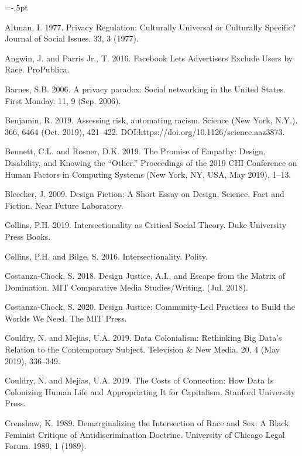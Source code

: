 \documentclass[11pt,dvipdfm]{article}
\begin{document}
\vspace{-.1cm}

\begin{thebibliography}{10}
\begin{small}
\itemsep=-.5pt

Altman, I. 1977. Privacy Regulation: Culturally Universal or Culturally Specific? Journal of Social Issues. 33, 3 (1977).

Angwin, J. and Parris Jr., T. 2016. Facebook Lets Advertisers Exclude Users by Race. ProPublica.

Barnes, S.B. 2006. A privacy paradox: Social networking in the United States. First Monday. 11, 9 (Sep. 2006).

Benjamin, R. 2019. Assessing risk, automating racism. Science (New York, N.Y.). 366, 6464 (Oct. 2019), 421–422. DOI:https://doi.org/10.1126/science.aaz3873.

Bennett, C.L. and Rosner, D.K. 2019. The Promise of Empathy: Design, Disability, and Knowing the “Other.” Proceedings of the 2019 CHI Conference on Human Factors in Computing Systems (New York, NY, USA, May 2019), 1–13.

Bleecker, J. 2009. Design Fiction: A Short Essay on Design, Science, Fact and Fiction. Near Future Laboratory.

Collins, P.H. 2019. Intersectionality as Critical Social Theory. Duke University Press Books.

Collins, P.H. and Bilge, S. 2016. Intersectionality. Polity.

Costanza-Chock, S. 2018. Design Justice, A.I., and Escape from the Matrix of Domination. MIT Comparative Media Studies/Writing. (Jul. 2018).

Costanza-Chock, S. 2020. Design Justice: Community-Led Practices to Build the Worlds We Need. The MIT Press.

Couldry, N. and Mejias, U.A. 2019. Data Colonialism: Rethinking Big Data’s Relation to the Contemporary Subject. Television \& New Media. 20, 4 (May 2019), 336–349. 

Couldry, N. and Mejias, U.A. 2019. The Costs of Connection: How Data Is Colonizing Human Life and Appropriating It for Capitalism. Stanford University Press.

Crenshaw, K. 1989. Demarginalizing the Intersection of Race and Sex: A Black Feminist Critique of Antidiscrimination Doctrine. University of Chicago Legal Forum. 1989, 1 (1989).


\end{small}
\end{thebibliography}
\end{document}
